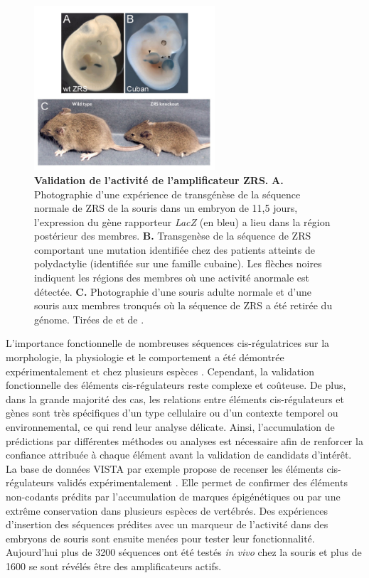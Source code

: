 \begin{figure}[h]
 \centering
 \includegraphics[width=0.6\textwidth, page=1] {figures/introduction/fig11.png}
 \caption[Validation de l'activité de l'\gls{amplificateur} \acrshort{ZRS}.]{
 \textbf{Validation de l'activité de l'\gls{amplificateur} \acrshort{ZRS}.}
 \textbf{A.} Photographie d'une expérience de transgénèse de la séquence normale de \acrshort{ZRS} de la souris dans un embryon de 11,5 jours, l'expression du gène rapporteur \textit{LacZ} (en bleu) a lieu dans la région postérieur des membres. 
 \textbf{B.} Transgenèse de la séquence de \acrshort{ZRS} comportant une mutation identifiée chez des patients atteints de polydactylie (identifiée sur une famille cubaine). Les flèches noires indiquent les régions des membres où une activité anormale est détectée. 
 \textbf{C.} Photographie d'une souris adulte normale et d'une souris aux membres tronqués où la séquence de \acrshort{ZRS} a été retirée du génome.
 Tirées de \citet{lettice_long-range_2003} et de \citep{sagai_elimination_2005}.\\
 }
 \label{fig:Fig11}
\end{figure}

L’importance fonctionnelle de nombreuses séquences \gls{cis}-régulatrices sur la morphologie, la physiologie et le comportement a été démontrée expérimentalement et chez plusieurs espèces \citep{wray_evolutionary_2007}. Cependant, la validation fonctionnelle des éléments \gls{cis}-régulateurs reste complexe et coûteuse. De plus, dans la grande majorité des cas, les relations entre éléments \gls{cis}-régulateurs et gènes sont très spécifiques d’un type cellulaire ou d’un contexte temporel ou environnemental, ce qui rend leur analyse délicate. Ainsi, l’accumulation de prédictions par différentes méthodes ou analyses est nécessaire afin de renforcer la confiance attribuée à chaque élément avant la validation de candidats d’intérêt. La base de données VISTA par exemple propose de recenser les éléments \gls{cis}-régulateurs validés expérimentalement \citep{visel_vista_2007}. Elle permet de confirmer des éléments non-codants prédits par l’accumulation de marques épigénétiques ou par une extrême conservation dans plusieurs espèces de vertébrés. Des expériences d’insertion des séquences prédites avec un marqueur de l’activité dans des embryons de souris sont ensuite menées pour tester leur fonctionnalité. Aujourd’hui plus de 3200 séquences ont été testés \textit{in vivo} chez la souris et plus de 1600 se sont révélés être des \glspl{amplificateur} actifs. \\

